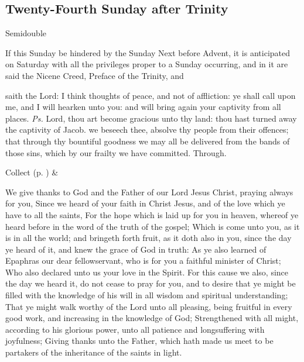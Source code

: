 
\clearpage
\subsection{Twenty-Fourth Sunday after Trinity}
\begin{inhead}
{Semidouble}
\end{inhead}
\begin{rubric}
If this Sunday be hindered by the Sunday Next before Advent, it is anticipated on Saturday with all the privileges proper to a Sunday occurring, and in it are said  the Nicene Creed, Preface of the Trinity, and 
\end{rubric}


\introit
{} saith the Lord: I think thoughts of peace, and not of affliction: ye shall call upon me, and I will hearken unto you: and will bring again your captivity from all places. \textit{Ps.} Lord, thou art become gracious unto thy land: thou hast turned away the captivity of Jacob.
\collect
{} we beseech thee, absolve thy people from their offences; that through thy bountiful goodness we may all be delivered from the bands of those sins, which by our frailty we have committed. Through.
\begin{rubric}
     Collect  (p. \pageref{SPSaints}) \&  
\end{rubric}

 We give thanks to God and the Father of our Lord Jesus Christ, praying always for you, Since we heard of your faith in Christ Jesus, and of the love which ye have to all the saints, For the hope which is laid up for you in heaven, whereof ye heard before in the word of the truth of the gospel; Which is come unto you, as it is in all the world; and bringeth forth fruit, as it doth also in you, since the day ye heard of it, and knew the grace of God in truth: As ye also learned of Epaphras our dear fellowservant, who is for you a faithful minister of Christ; Who also declared unto us your love in the Spirit. For this cause we also, since the day we heard it, do not cease to pray for you, and to desire that ye might be filled with the knowledge of his will in all wisdom and spiritual understanding; That ye might walk worthy of the Lord unto all pleasing, being fruitful in every good work, and increasing in the knowledge of God; Strengthened with all might, according to his glorious power, unto all patience and longsuffering with joyfulness; Giving thanks unto the Father, which hath made us meet to be partakers of the inheritance of the saints in light.

